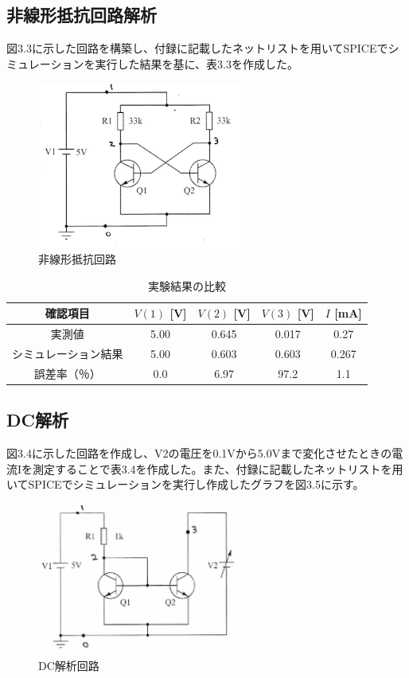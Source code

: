 \documentclass{jlreq}
\numberwithin{equation}{section}
\begin{document}
\subsection{非線形抵抗回路解析}
図3.3に示した回路を構築し、付録に記載したネットリストを用いてSPICEでシミュレーションを実行した結果を基に、表3.3を作成した。

\begin{figure}[H]
  \centering
  \includegraphics[width=0.6\textwidth]{assets/hisenkeikairo.png}
  \caption{非線形抵抗回路}
\end{figure}

\begin{table}[H]
  \centering
  \caption{実験結果の比較}
  \begin{tabular}{|c|c|c|c|c|}
    \hline
    確認項目 & \( V(1) \) [V] & \( V(2) \) [V] & \( V(3) \) [V] & \( I \) [mA] \\ \hline
    実測値 & 5.00 & 0.645 & 0.017 & 0.27 \\ \hline
    シミュレーション結果 & 5.00 & 0.603 & 0.603 & 0.267\\ \hline
    誤差率（％） & 0.0 & 6.97 & 97.2 & 1.1 \\ \hline
  \end{tabular}
\end{table}

\subsection{DC解析}
図3.4に示した回路を作成し、V2の電圧を0.1Vから5.0Vまで変化させたときの電流Iを測定することで表3.4を作成した。また、付録に記載したネットリストを用いてSPICEでシミュレーションを実行し作成したグラフを図3.5に示す。

\begin{figure}[H]
  \centering
  \includegraphics[width=0.6\textwidth]{assets/dckairo.png}
  \caption{DC解析回路}
\end{figure}
\end{document}
